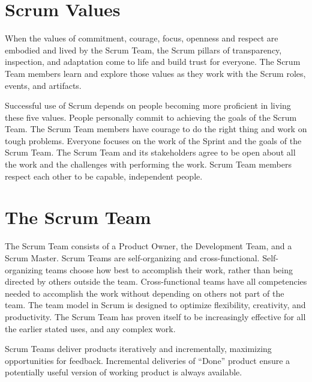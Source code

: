 \section{Scrum Values}
When the values of commitment, courage, focus, openness and respect are embodied and lived
by the Scrum Team, the Scrum pillars of transparency, inspection, and adaptation come to life
and build trust for everyone. The Scrum Team members learn and explore those values as they
work with the Scrum roles, events, and artifacts.

Successful use of Scrum depends on people becoming more proficient in living these five values.
People personally commit to achieving the goals of the Scrum Team. The Scrum Team members
have courage to do the right thing and work on tough problems. Everyone focuses on the work
of the Sprint and the goals of the Scrum Team. The Scrum Team and its stakeholders agree to be
open about all the work and the challenges with performing the work. Scrum Team members
respect each other to be capable, independent people.

\section{The Scrum Team}
The Scrum Team consists of a Product Owner, the Development Team, and a Scrum Master.
Scrum Teams are self-organizing and cross-functional. Self-organizing teams choose how best to
accomplish their work, rather than being directed by others outside the team. Cross-functional
teams have all competencies needed to accomplish the work without depending on others not
part of the team. The team model in Scrum is designed to optimize flexibility, creativity, and
productivity. The Scrum Team has proven itself to be increasingly effective for all the earlier
stated uses, and any complex work.

Scrum Teams deliver products iteratively and incrementally, maximizing opportunities for
feedback. Incremental deliveries of ``Done'' product ensure a potentially useful version of
working product is always available.

